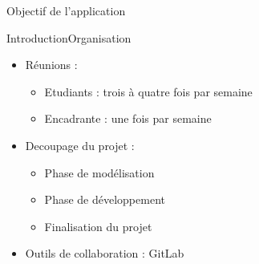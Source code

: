 \documentclass[10pt,handout]{beamer}
\newif\ifplacelogo %
\begin{document}
\placelogofalse
\begin{frame}{Objectif de l'application}
\end{frame}
\placelogotrue

\begin{frame}{Introduction}{Organisation}
  \begin{itemize}
    \item Réunions :
    \begin{itemize}
      \item Etudiants : trois à quatre fois par semaine
      \item Encadrante : une fois par semaine
    \end{itemize}
    \item Decoupage du projet :
    \begin{itemize}
      \item Phase de modélisation
      \item Phase de développement
      \item Finalisation du projet
    \end{itemize}
    \item Outils de collaboration : GitLab
  \end{itemize}
\end{frame}
\end{document}
